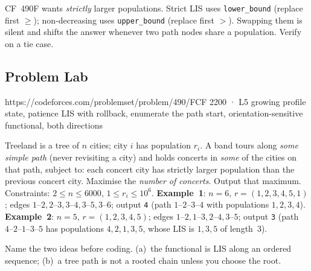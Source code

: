 \begin{warningbox}
CF~490F wants \emph{strictly} larger populations. Strict LIS uses
\lstinline{lower_bound} (replace first $\ge$); non-decreasing uses
\lstinline{upper_bound} (replace first $>$). Swapping them is silent and shifts the
answer whenever two path nodes share a population. Verify on a tie case.
\end{warningbox}

\subsection{Problem Lab}

  {https://codeforces.com/problemset/problem/490/F}{CF 2200 · L5}
  {growing profile state, patience LIS with rollback, enumerate the path start,
   orientation-sensitive functional, both directions}

\begin{problemstatement}
Treeland is a tree of $n$ cities; city $i$ has population $r_i$. A band tours along
\emph{some simple path} (never revisiting a city) and holds concerts in \emph{some}
of the cities on that path, subject to: each concert city has strictly larger
population than the previous concert city. Maximise the \emph{number of concerts}.
Output that maximum. Constraints: $2 \le n \le 6000$, $1 \le r_i \le 10^6$.
\textbf{Example~1}: $n=6$, $r = (1,2,3,4,5,1)$; edges $1\text{--}2, 2\text{--}3,
3\text{--}4, 3\text{--}5, 3\text{--}6$; output \texttt{4} (path $1\text{--}2\text{--}3\text{--}4$
with populations $1,2,3,4$). \textbf{Example~2}: $n=5$, $r=(1,2,3,4,5)$; edges
$1\text{--}2, 1\text{--}3, 2\text{--}4, 3\text{--}5$; output \texttt{3} (path
$4\text{--}2\text{--}1\text{--}3\text{--}5$ has populations $4,2,1,3,5$, whose LIS
is $1,3,5$ of length~$3$).
\end{problemstatement}

\begin{attemptgate}
Name the two ideas before coding. (a)~the functional is LIS along an ordered
sequence; (b)~a tree path is not a rooted chain unless you choose the root.
\end{attemptgate}

